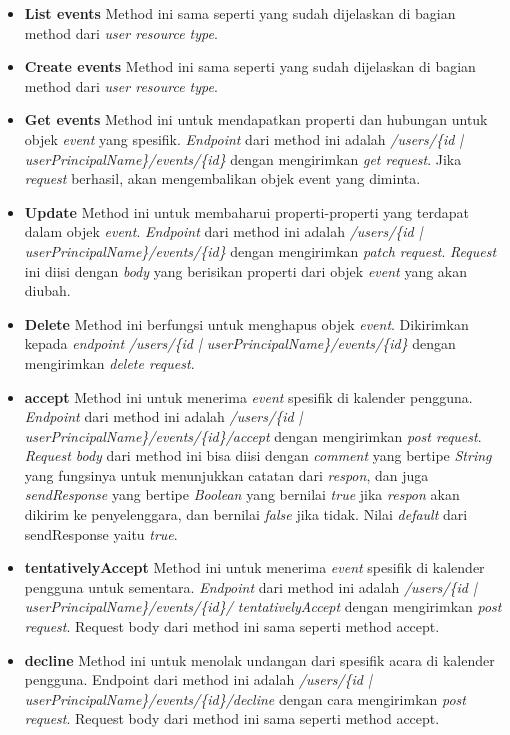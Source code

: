 \begin{itemize}
	\item \textbf{List events}
	Method ini sama seperti yang sudah dijelaskan di bagian method dari \textit{user resource type}. 
	\item \textbf{Create events}
	Method ini sama seperti yang sudah dijelaskan di bagian method dari \textit{user resource type}. 
	\item \textbf{Get events}
	Method ini untuk mendapatkan properti dan hubungan untuk objek \textit{event} yang spesifik. \textit{Endpoint} dari method ini adalah \textit{/users/\{id | userPrincipalName\}/events/\{id\}} dengan mengirimkan \textit{get request}. Jika \textit{request} berhasil, akan mengembalikan objek event yang diminta.
	\item \textbf{Update}
	Method ini untuk membaharui properti-properti yang terdapat dalam objek \textit{event}. \textit{Endpoint} dari method ini adalah \textit{/users/\{id | userPrincipalName\}/events/\{id\}} dengan mengirimkan \textit{patch request}. \textit{Request} ini diisi dengan \textit{body} yang berisikan properti dari objek \textit{event} yang akan diubah. 
	\item \textbf{Delete}
	Method ini berfungsi untuk menghapus objek \textit{event}. Dikirimkan kepada \textit{endpoint} \textit{/users/\{id | userPrincipalName\}/events/\{id\}} dengan mengirimkan \textit{delete request}.  
	\item \textbf{accept}
	Method ini untuk menerima \textit{event} spesifik di kalender pengguna. \textit{Endpoint} dari method ini adalah \textit{/users/\{id | userPrincipalName\}/events/\{id\}/accept} dengan mengirimkan \textit{post request}. \textit{Request body} dari method ini bisa diisi dengan \textit{comment} yang bertipe \textit{String} yang fungsinya untuk menunjukkan catatan dari \textit{respon}, dan juga \textit{sendResponse} yang bertipe \textit{Boolean} yang bernilai \textit{true} jika \textit{respon} akan dikirim ke penyelenggara, dan bernilai \textit{false} jika tidak. Nilai \textit{default} dari sendResponse yaitu \textit{true}. 
	\item \textbf{tentativelyAccept}
	Method ini untuk menerima \textit{event} spesifik di kalender pengguna untuk sementara. \textit{Endpoint} dari method ini adalah \textit{/users/\{id | userPrincipalName\}/events/\{id\}/ tentativelyAccept} dengan mengirimkan \textit{post request}. Request body dari method ini sama seperti method accept.
	\item \textbf{decline}
	Method ini untuk menolak undangan dari spesifik acara di kalender pengguna. Endpoint dari method ini adalah \textit{/users/\{id | userPrincipalName\}/events/\{id\}/decline} dengan cara mengirimkan \textit{post request}. Request body dari method ini sama seperti method accept.   

\end{itemize}
